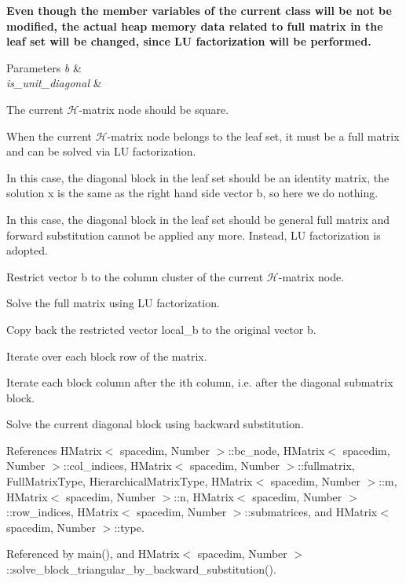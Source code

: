 {\bfseries Even though the member variables of the current class will be not be modified, the actual heap memory data related to full matrix in the leaf set will be changed, since LU factorization will be performed.}


\begin{DoxyParams}{Parameters}
{\em b} & \\
\hline
{\em is\+\_\+unit\+\_\+diagonal} & \\
\hline
\end{DoxyParams}
The current $\mathcal{H}$-\/matrix node should be square.

When the current $\mathcal{H}$-\/matrix node belongs to the leaf set, it must be a full matrix and can be solved via LU factorization.

In this case, the diagonal block in the leaf set should be an identity matrix, the solution {\ttfamily x} is the same as the right hand side vector {\ttfamily b}, so here we do nothing.

In this case, the diagonal block in the leaf set should be general full matrix and forward substitution cannot be applied any more. Instead, LU factorization is adopted.

Restrict vector {\ttfamily b} to the column cluster of the current $\mathcal{H}$-\/matrix node.

Solve the full matrix using LU factorization.

Copy back the restricted vector {\ttfamily local\+\_\+b} to the original vector {\ttfamily b}.

Iterate over each block row of the matrix.

Iterate each block column after the i\textquotesingle{}th column, i.\+e. after the diagonal submatrix block.

Solve the current diagonal block using backward substitution.

References H\+Matrix$<$ spacedim, Number $>$\+::bc\+\_\+node, H\+Matrix$<$ spacedim, Number $>$\+::col\+\_\+indices, H\+Matrix$<$ spacedim, Number $>$\+::fullmatrix, Full\+Matrix\+Type, Hierarchical\+Matrix\+Type, H\+Matrix$<$ spacedim, Number $>$\+::m, H\+Matrix$<$ spacedim, Number $>$\+::n, H\+Matrix$<$ spacedim, Number $>$\+::row\+\_\+indices, H\+Matrix$<$ spacedim, Number $>$\+::submatrices, and H\+Matrix$<$ spacedim, Number $>$\+::type.



Referenced by main(), and H\+Matrix$<$ spacedim, Number $>$\+::solve\+\_\+block\+\_\+triangular\+\_\+by\+\_\+backward\+\_\+substitution().

